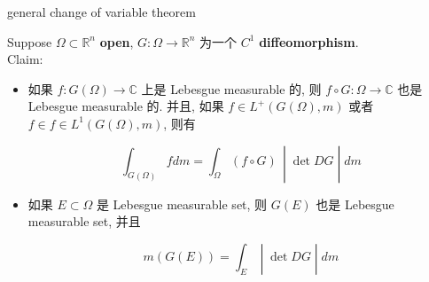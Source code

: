 \documentclass{qlnotes-export}
\begin{document}
\begin{theorem}{general change of variable theorem}\label{thm-07-lebesgue-measure-on-r-n-general-change-of-variable-theorem}

Suppose \(\Omega \subset {\mathbb{R}}^{n}\) \textbf{open}, \(G:\Omega\rightarrow{\mathbb{R}}^{n}\) 为一个 \(C^{1}\) \textbf{diffeomorphism}.\\
Claim:

\begin{itemize}
\item
  如果 \(f:G(\Omega)\rightarrow{\mathbb{C}}\) 上是 Lebesgue measurable 的, 则 \(f \circ G:\Omega\rightarrow{\mathbb{C}}\) 也是 Lebesgue measurable 的. 并且, 如果 \(f \in L^{+}(G(\Omega),m)\) 或者 \(f \in f \in L^{1}(G(\Omega),m)\), 则有

  \[\left. \int_{G(\Omega)}f dm = \int_{\Omega}(f \circ G)\, \middle| \det DG \middle| dm \right.\]
\item
  如果 \(E \subset \Omega\) 是 Lebesgue measurable set, 则 \(G(E)\) 也是 Lebesgue measurable set, 并且

  \[\left. m(G(E)) = \int_{E} \middle| \det DG \middle| dm \right.\]
\end{itemize}

\end{theorem}
\end{document}
